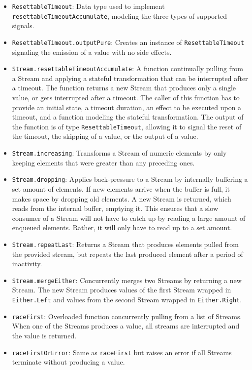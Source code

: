 \begin{itemize}
    \item \lstinline|ResettableTimeout|: Data type used to implement \lstinline|resettableTimeoutAccumulate|, modeling the three types of supported signals.
    \item \lstinline|ResettableTimeout.outputPure|: Creates an instance of \lstinline|ResettableTimeout| signaling the emission of a value with no side effects.
    \item \lstinline|Stream.resettableTimeoutAccumulate|: A function continually pulling from a Stream and applying a stateful transformation that can be interrupted after a timeout. The function returns a new Stream that produces only a single value, or gets interrupted after a timeout. The caller of this function has to provide an initial state, a timeout duration, an effect to be executed upon a timeout, and a function modeling the stateful transformation. The output of the function is of type \lstinline|ResettableTimeout|, allowing it to signal the reset of the timeout, the skipping of a value, or the output of a value.
    \item \lstinline|Stream.increasing|: Transforms a Stream of numeric elements by only keeping elements that were greater than any preceding ones.
    \item \lstinline|Stream.dropping|: Applies back-pressure to a Stream by internally buffering a set amount of elements. If new elements arrive when the buffer is full, it makes space by dropping old elements. A new Stream is returned, which reads from the internal buffer, emptying it. This ensures that a slow consumer of a Stream will not have to catch up by reading a large amount of enqueued elements. Rather, it will only have to read up to a set amount.
    \item \lstinline|Stream.repeatLast|: Returns a Stream that produces elements pulled from the provided stream, but repeats the last produced element after a period of inactivity.
    \item \lstinline|Stream.mergeEither|: Concurrently merges two Streams by returning a new Stream. The new Stream produces values of the first Stream wrapped in \lstinline|Either.Left| and values from the second Stream wrapped in \lstinline|Either.Right|.
    \item \lstinline|raceFirst|: Overloaded function concurrently pulling from a list of Streams. When one of the Streams produces a value, all streams are interrupted and the value is returned.
    \item \lstinline|raceFirstOrError|: Same as \lstinline|raceFirst| but raises an error if all Streams terminate without producing a value.

\end{itemize}
